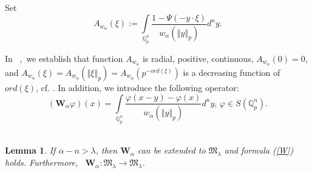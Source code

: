 \documentclass{amsart}\usepackage{amsfonts}
\theoremstyle{plain}
\newtheorem{lemma}[theorem]{Lemma}
\numberwithin{equation}{section}
\begin{document}
Set
\[
A_{w_{\alpha}}\left(  \xi\right)  :={\int\limits_{\mathbb{Q}_{p}^{n}}}\frac{1-\Psi\left(  -y\cdot\xi\right)  }{w_{\alpha}\left(  \left\Vert
y\right\Vert _{p}\right)  }d^{n}y.
\]


In \ \cite{Ch-Z},\ we establish that function $A_{w_{\alpha}}$ is radial,
positive, continuous, $A_{w_{\alpha}}\left(  0\right)  =0$, and $A_{w_{\alpha
}}\left(  \xi\right)  =A_{w_{\alpha}}\left(  \left\Vert \xi\right\Vert
_{p}\right)  =A_{w_{\alpha}}\left(  p^{-ord(\xi)}\right)  $ is a decreasing
function of $ord(\xi)$, cf. \cite[Lemma 3.2]{Ch-Z}. In addition, we introduce
the following operator:\begin{equation}
(\boldsymbol{W}_{\alpha}\varphi)(x)={\int\limits_{\mathbb{Q}_{p}^{n}}}\frac{\varphi\left(  x-y\right)  -\varphi\left(  x\right)  }{w_{\alpha}\left(
\left\Vert y\right\Vert _{p}\right)  }d^{n}y\text{, }\varphi\in S(\mathbb{Q}_{p}^{n})\text{.} \label{W}\end{equation}
\ 

\begin{lemma}
\label{lemma1}If $\alpha-n>\lambda$, then $\boldsymbol{W}_{\alpha}$ can be
extended to $\mathcal{\mathfrak{M}}_{\lambda}$ and formula (\ref{W}) holds.
Furthermore, \ $\boldsymbol{W}_{\alpha}:\mathcal{\mathfrak{M}}_{\lambda
}\rightarrow\mathcal{\mathfrak{M}}_{\lambda}$.
\end{lemma}
\end{document}
